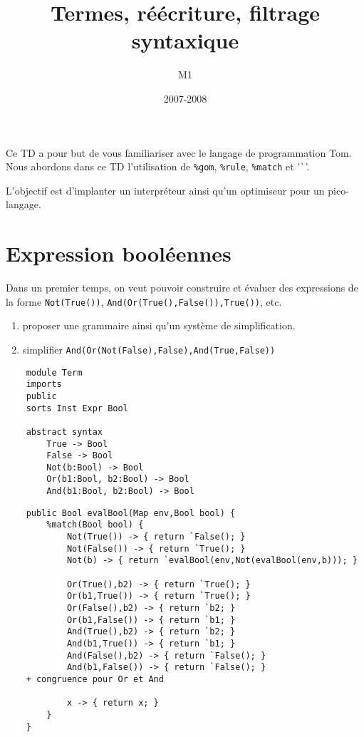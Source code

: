 \documentclass[11pt]{article}
\title{Termes, réécriture, filtrage syntaxique}
\date{2007-2008}
\author{M1}
\begin{document}
\maketitle

Ce TD a pour but de vous familiariser avec le langage de programmation Tom.
Nous abordons dans ce TD l'utilisation de \verb|%gom|, \verb|%rule|, \verb|%match| et '\verb|`|'.

L'objectif est d'implanter un interpréteur ainsi qu'un optimiseur pour un pico-langage.

\section{Expression booléennes}
Dans un premier temps, on veut pouvoir construire et évaluer des expressions de la forme \verb|Not(True())|, \verb|And(Or(True(),False()),True())|, etc.

\begin{enumerate}
\item proposer une grammaire ainsi qu'un système de simplification.
\item simplifier \texttt{And(Or(Not(False),False),And(True,False))}
\end{enumerate}

\begin{versionProf}
\begin{verbatim}
    module Term
    imports 
    public
    sorts Inst Expr Bool
      
    abstract syntax
		True -> Bool
		False -> Bool
		Not(b:Bool) -> Bool
		Or(b1:Bool, b2:Bool) -> Bool
		And(b1:Bool, b2:Bool) -> Bool
\end{verbatim}

\begin{verbatim}
	public Bool evalBool(Map env,Bool bool) {
		%match(Bool bool) {	
			Not(True()) -> { return `False(); }
			Not(False()) -> { return `True(); }
			Not(b) -> { return `evalBool(env,Not(evalBool(env,b))); }

			Or(True(),b2) -> { return `True(); }
			Or(b1,True()) -> { return `True(); }
			Or(False(),b2) -> { return `b2; }
			Or(b1,False()) -> { return `b1; }
			And(True(),b2) -> { return `b2; }
			And(b1,True()) -> { return `b1; }
			And(False(),b2) -> { return `False(); }
			And(b1,False()) -> { return `False(); }
    + congruence pour Or et And

			x -> { return x; }
		}
	}

\end{verbatim}
\end{versionProf}
\end{document}
